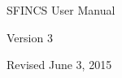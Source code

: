 \begin{center}

\vspace*{2in}

{\Huge SFINCS User Manual}

\vspace{4in}

{\Large Version 3}

\vspace{0.5in}

Revised June 3, 2015

\end{center}

